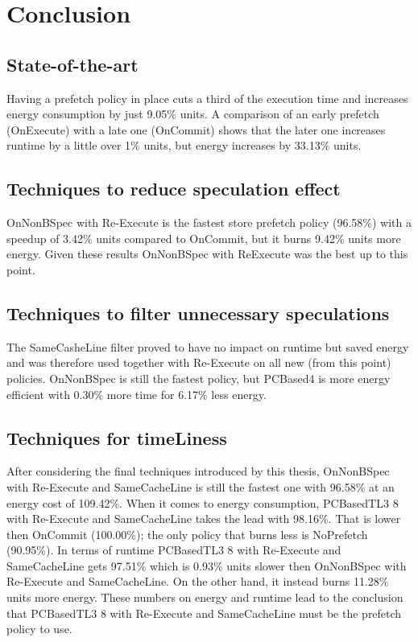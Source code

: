 \chapter{Conclusion}
\label{chap:conclusion}

\section{State-of-the-art} Having a prefetch policy in place cuts a third of the execution time and increases energy consumption by just 9.05\% units. A comparison of an early prefetch
(OnExecute) with a late one (OnCommit) shows that the later one increases runtime
by a little over 1\% units, but energy increases by 33.13\% units.

\section{Techniques to reduce speculation effect}  OnNonBSpec with Re-Execute is the fastest store prefetch policy (96.58\%) with a speedup of 3.42\%
units compared to OnCommit, but it burns 9.42\% units more energy. Given these results OnNonBSpec with ReExecute was the best up to this point. 

\section{Techniques to filter unnecessary speculations} The SameCasheLine filter proved to have no impact on runtime but saved energy and was therefore used together with Re-Execute on all new (from this point) policies. OnNonBSpec is still the fastest policy, but PCBased4 is more energy efficient with 0.30\% more time for 6.17\% less energy.

\section{Techniques for timeLiness} 
After considering the final techniques introduced by this thesis, OnNonBSpec with
Re-Execute and SameCacheLine is still the fastest one with 96.58\% at an energy
cost of 109.42\%. When it comes to energy consumption, PCBasedTL3 8 with Re-Execute
and SameCacheLine takes the lead with 98.16\%. That is lower then OnCommit
(100.00\%); the only policy that burns less is NoPrefetch (90.95\%). In terms of runtime
PCBasedTL3 8 with Re-Execute and SameCacheLine gets 97.51\% which is 0.93\%
units slower then OnNonBSpec with Re-Execute and SameCacheLine. On the other
hand, it instead burns 11.28\% units more energy. These numbers on energy and runtime lead to the conclusion that PCBasedTL3 8 with Re-Execute and SameCacheLine must be the prefetch
policy to use.

